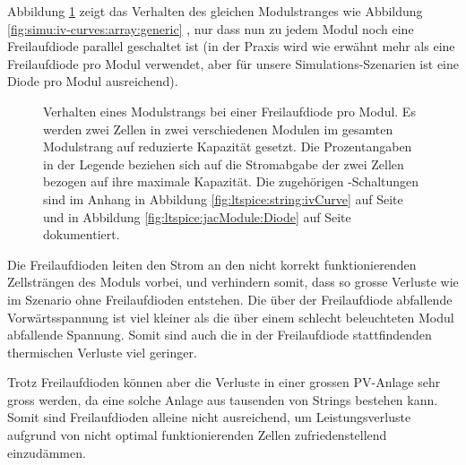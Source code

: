 \clearpage
Abbildung     \ref{fig:simu:iv-curves:array:generic:bypass}      zeigt     das
Verhalten       des      gleichen       Modulstranges      wie       Abbildung
\ref{fig:simu:iv-curves:array:generic} , nur dass nun zu jedem Modul noch eine
Freilaufdiode  parallel  geschaltet ist  (in  der  Praxis wird  wie  erw\"ahnt
mehr  als   eine  Freilaufdiode  pro   Modul  verwendet,  aber   f\"ur  unsere
Simulations-Szenarien ist eine Diode pro Modul ausreichend).

\begin{figure}[h!tb]
    \centering
    
    \caption[%
        IV- und PV-Kurven eines Modulsstrangs bei Leistungseinbruch,
        mit Freilaufdioden%
    ]
    {
        Verhalten   eines    Modulstrangs   bei   einer    Freilaufdiode   pro
        Modul. Es    werden     zwei    Zellen    in     zwei    verschiedenen
        Modulen   im   gesamten   Modulstrang   auf   reduzierte   Kapazit\"at
        gesetzt.   Die   Prozentangaben   in   der   Legende   beziehen   sich
        auf   die    Stromabgabe   der   zwei   Zellen    bezogen   auf   ihre
        maximale  Kapazit\"at. Die   zugeh\"origen  -Schaltungen
        sind   im   Anhang   in   Abbildung   \ref{fig:ltspice:string:ivCurve}
        auf     Seite      \pageref{fig:ltspice:string:ivCurve}     und     in
        Abbildung       \ref{fig:ltspice:jacModule:Diode}      auf       Seite
        \pageref{fig:ltspice:jacModule:Diode} dokumentiert.%
    }
    \label{fig:simu:iv-curves:array:generic:bypass}
\end{figure}

Die  Freilaufdioden leiten  den Strom  an den  nicht korrekt  funktionierenden
Zellstr\"angen  des  Moduls  vorbei,  und verhindern  somit,  dass  so  grosse
Verluste  wie  im  Szenario  ohne  Freilaufdioden  entstehen. Die  \"uber  der
Freilaufdiode abfallende  Vorw\"artsspannung ist  viel kleiner als  die \"uber
einem schlecht beleuchteten Modul abfallende Spannung.  Somit sind auch die in
der Freilaufdiode stattfindenden thermischen Verluste viel geringer.

Trotz   Freilaufdioden   k\"onnen  aber   die   Verluste   in  einer   grossen
PV-Anlage  sehr  gross  werden,  da  eine  solche  Anlage  aus  tausenden  von
Strings bestehen  kann. Somit sind  Freilaufdioden alleine  nicht ausreichend,
um  Leistungsverluste  aufgrund  von  nicht  optimal  funktionierenden  Zellen
zufriedenstellend einzud\"ammen.

\clearpage
